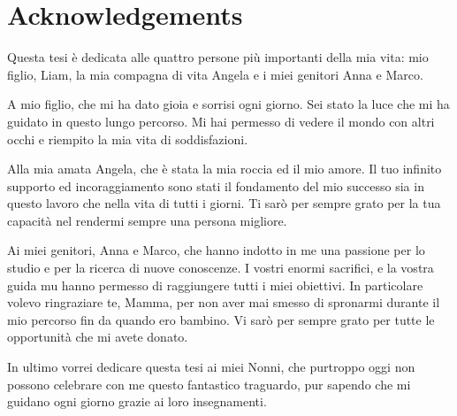 \documentclass{Configuration_Files/PoliMi3i_thesis}
\begin{document}
\cleardoublepage
{} %

\listoffigures

\listoftables

\lstlistoflistings

\chapter*{Acknowledgements}
Questa tesi è dedicata alle quattro persone più importanti della mia vita: mio figlio, Liam, la mia compagna di vita Angela e i miei genitori Anna e Marco.

A mio figlio, che mi ha dato gioia e sorrisi ogni giorno. 
Sei stato la luce che mi ha guidato in questo lungo percorso. 
Mi hai permesso di vedere il mondo con altri occhi e riempito la mia vita di soddisfazioni.

Alla mia amata Angela, che è stata la mia roccia ed il mio amore.
Il tuo infinito supporto ed incoraggiamento sono stati il fondamento del mio successo sia in questo lavoro che nella vita di tutti i giorni.
Ti sarò per sempre grato per la tua capacità nel rendermi sempre una persona migliore.

Ai miei genitori, Anna e Marco, che hanno indotto in me una passione per lo studio e per la ricerca di nuove conoscenze.
I vostri enormi sacrifici, e la vostra guida mu hanno permesso di raggiungere tutti i miei obiettivi.
In particolare volevo ringraziare te, Mamma, per non aver mai smesso di spronarmi durante il mio percorso fin da quando ero bambino. 
Vi sarò per sempre grato per tutte le opportunità che mi avete donato.

In ultimo vorrei dedicare questa tesi ai miei Nonni, che purtroppo oggi non possono celebrare con me questo fantastico traguardo, pur sapendo che mi guidano ogni giorno grazie ai loro insegnamenti.

\cleardoublepage
\end{document}
